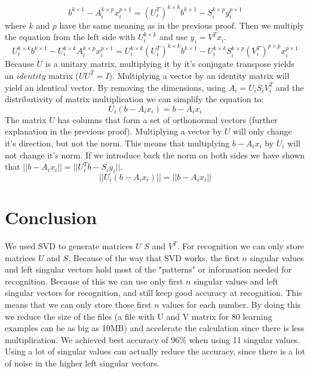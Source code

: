 \documentclass[12pt]{article}
\begin{document}
\[
b^{k \times 1} - A_i^{k \times p} x_i^{p \times 1} = (U_i^{T})^{k \times k}b^{k \times 1} - S_i^{k \times p}y_i^{p \times 1}
\]
\newline
where $k$ and $p$ have the same meaning as in the previous proof. Then we multiply the equation from the left side with $U_i^{k \times k}$ and use $y_i = V^Tx_i$. \\

\[
U_i^{k \times k}b^{k \times 1} - U_i^{k \times k}A_i^{k \times p} x_i^{p \times 1} = U_i^{k \times k}(U_i^{T})^{k \times k}b^{k \times 1} - U_i^{k \times k}S_i^{k \times p}(V_i^{T})^{p \times p}x_i^{p \times 1}
\]
\newline
Because $U$ is a unitary matrix, multiplying it by it's conjugate transpose yields an $identity$ matrix ($UU^T = I$). Multiplying a vector by an identity matrix will yield an identical vector. By removing the dimensions, using $A_i = U_iS_iV_i^{T}$ and the distributivity of matrix multiplication we can simplify the equation to: \\

\[
U_i(b - A_ix_i) = b - A_ix_i
\]
\newline
The matrix $U$ has columns that form a set of orthonormal vectors (further explanation in the previous proof). Multiplying a vector by $U$ will only change it's direction, but not the norm. This means that multiplying $b - A_ix_i$ by $U_i$ will not change it's norm. If we introduce back the norm on both sides we have shown that $||b - A_ix_i|| = ||U_i^{T}b - S_iy_i||$. \\
\[
||U_i(b - A_ix_i)|| = ||b - A_ix_i||
\]

\newpage
\section{Conclusion}

We used SVD to generate matrices $U$ $S$ and $V^T$. For recognition we can only store matrices $U$ and $S$. Because of the way that SVD works, the first $n$ singular values and left singular vectors hold most of the "patterns" or information needed for recognition. Because of this we can use only first $n$ singular values and left singular vectors for recognition, and still keep good accuracy at recognition. This means that we can only store those first $n$ values for each number. By doing this we reduce the size of the files (a file with U and V matrix for 80 learning examples can be as big as 10MB) and accelerate the calculation since there is less multiplication. We achieved best accuracy of 96\% when using 11 singular values. Using a lot of singular values can actually reduce the accuracy, since there is a lot of noise in the higher left singular vectors.
\end{document}
